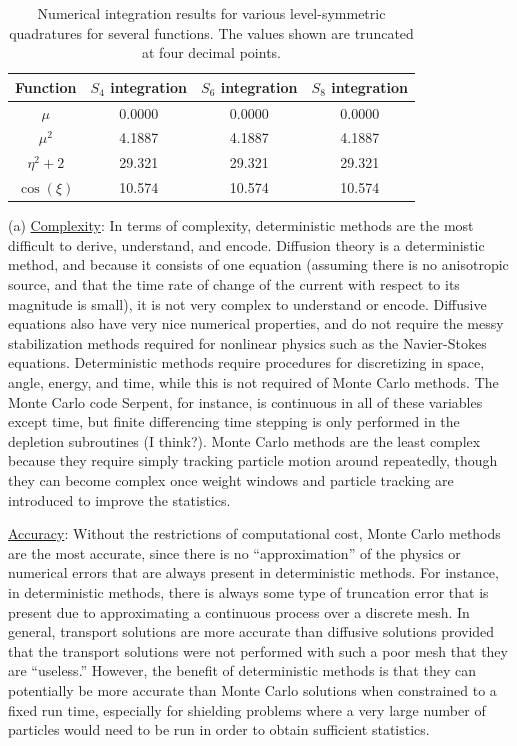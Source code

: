 \documentclass[10pt]{article}
\newcommand*\circled[1]{\tikz[baseline=(char.base)]{
            \node[shape=circle,draw,inner sep=2pt] (char) {#1};}}
\begin{document}
\begin{table}[H]
\caption{Numerical integration results for various level-symmetric quadratures for several functions. The values shown are truncated at four decimal points.}
\centering
\begin{tabular}{c c c c}
\hline\hline
Function & \(S_4\) integration & \(S_6\) integration & \(S_8\) integration\\ [0.5ex]
\hline
\(\mu\) 		& 0.0000 	& 0.0000 	& 0.0000\\
\(\mu^2\)		& 4.1887	& 4.1887	& 4.1887\\
\(\eta^2+2\)	& 29.321	& 29.321	& 29.321\\
\(\cos{(\xi)}\)	& 10.574	& 10.574	& 10.574\\
\hline
\end{tabular}
\label{table:3}
\end{table}


\circled{3} (a) \underline{Complexity}: In terms of complexity, deterministic methods are the most difficult to derive, understand, and encode. Diffusion theory is a deterministic method, and because it consists of one equation (assuming there is no anisotropic source, and that the time rate of change of the current with respect to its magnitude is small), it is not very complex to understand or encode. Diffusive equations also have very nice numerical properties, and do not require the messy stabilization methods required for nonlinear physics such as the Navier-Stokes equations. Deterministic methods require procedures for discretizing in space, angle, energy, and time, while this is not required of Monte Carlo methods. The Monte Carlo code Serpent, for instance, is continuous in all of these variables except time, but finite differencing time stepping is only performed in the depletion subroutines (I think?). Monte Carlo methods are the least complex because they require simply tracking particle motion around repeatedly, though they can become complex once weight windows and particle tracking are introduced to improve the statistics.\newline

\underline{Accuracy}: Without the restrictions of computational cost, Monte Carlo methods are the most accurate, since there is no ``approximation'' of the physics or numerical errors that are always present in deterministic methods. For instance, in deterministic methods, there is always some type of truncation error that is present due to approximating a continuous process over a discrete mesh. In general, transport solutions are more accurate than diffusive solutions provided that the transport solutions were not performed with such a poor mesh that they are ``useless.'' However, the benefit of deterministic methods is that they can potentially be more accurate than Monte Carlo solutions when constrained to a fixed run time, especially for shielding problems where a very large number of particles would need to be run in order to obtain sufficient statistics.\newline
\end{document}
